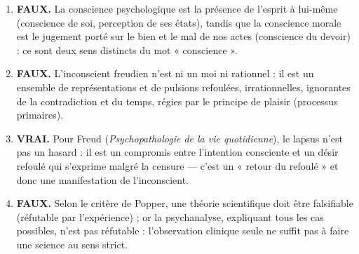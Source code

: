 \documentclass[11pt]{article}
\begin{document}
\begin{corrige}
\begin{enumerate}
\item \textbf{FAUX.} La conscience psychologique est la présence de l'esprit à lui-même (conscience de soi, perception de ses états), tandis que la conscience morale est le jugement porté sur le bien et le mal de nos actes (conscience du devoir) : ce sont deux sens distincts du mot « conscience ».
\item \textbf{FAUX.} L'inconscient freudien n'est ni un moi ni rationnel : il est un ensemble de représentations et de pulsions refoulées, irrationnelles, ignorantes de la contradiction et du temps, régies par le principe de plaisir (processus primaires).
\item \textbf{VRAI.} Pour Freud (\emph{Psychopathologie de la vie quotidienne}), le lapsus n'est pas un hasard : il est un compromis entre l'intention consciente et un désir refoulé qui s'exprime malgré la censure — c'est un « retour du refoulé » et donc une manifestation de l'inconscient.
\item \textbf{FAUX.} Selon le critère de Popper, une théorie scientifique doit être falsifiable (réfutable par l'expérience) ; or la psychanalyse, expliquant tous les cas possibles, n'est pas réfutable : l'observation clinique seule ne suffit pas à faire une science au sens strict.
\end{enumerate}
\end{corrige}
\end{document}
